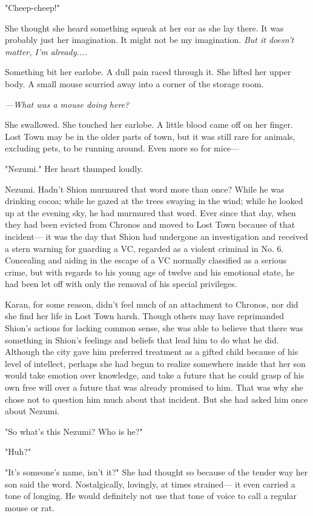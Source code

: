 "Cheep-cheep!"

She thought she heard something squeak at her ear as she lay there. It
was probably just her imagination. It might not be my imagination. \emph{But
it doesn't matter, I'm already....}

Something bit her earlobe. A dull pain raced through it. She lifted her
upper body. A small mouse scurried away into a corner of the storage
room.

\emph{---What was a mouse doing here?}

She swallowed. She touched her earlobe. A little blood came off on her
finger. Lost Town may be in the older parts of town, but it was still
rare for animals, excluding pets, to be running around. Even more so for
mice---

"Nezumi." Her heart thumped loudly.

Nezumi. Hadn't Shion murmured that word more than once? While he was
drinking cocoa; while he gazed at the trees swaying in the wind; while
he looked up at the evening sky, he had murmured that word. Ever since
that day, when they had been evicted from Chronos and moved to Lost Town
because of that incident--- it was the day that Shion had undergone an
investigation and received a stern warning for guarding a VC, regarded
as a violent criminal in No. 6. Concealing and aiding in the escape of a
VC normally classified as a serious crime, but with regards to his young
age of twelve and his emotional state, he had been let off with only the
removal of his special privileges.

Karan, for some reason, didn't feel much of an attachment to Chronos,
nor did she find her life in Lost Town harsh. Though others may have
reprimanded Shion's actions for lacking common sense, she was able to
believe that there was something in Shion's feelings and beliefs that
lead him to do what he did. Although the city gave him preferred
treatment as a gifted child because of his level of intellect, perhaps
she had begun to realize somewhere inside that her son would take
emotion over knowledge, and take a future that he could grasp of his own
free will over a future that was already promised to him. That was why
she chose not to question him much about that incident. But she had
asked him once about Nezumi.

"So what's this Nezumi? Who is he?"

"Huh?"

"It's someone's name, isn't it?" She had thought so because of the
tender way her son said the word. Nostalgically, lovingly, at times
strained--- it even carried a tone of longing. He would definitely not use
that tone of voice to call a regular mouse or rat.

